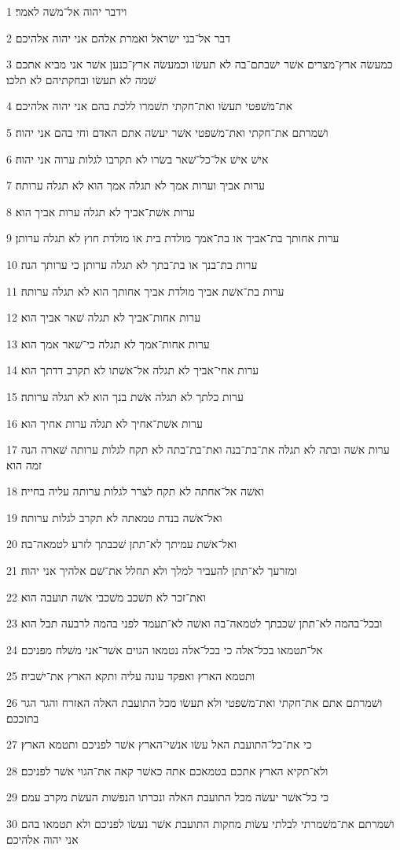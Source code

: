 \par 1 וידבר יהוה אל־משׁה לאמר׃
\par 2 דבר אל־בני ישׂראל ואמרת אלהם אני יהוה אלהיכם׃
\par 3 כמעשׂה ארץ־מצרים אשׁר ישׁבתם־בה לא תעשׂו וכמעשׂה ארץ־כנען אשׁר אני מביא אתכם שׁמה לא תעשׂו ובחקתיהם לא תלכו׃
\par 4 את־משׁפטי תעשׂו ואת־חקתי תשׁמרו ללכת בהם אני יהוה אלהיכם׃
\par 5 ושׁמרתם את־חקתי ואת־משׁפטי אשׁר יעשׂה אתם האדם וחי בהם אני יהוה׃
\par 6 אישׁ אישׁ אל־כל־שׁאר בשׂרו לא תקרבו לגלות ערוה אני יהוה׃
\par 7 ערות אביך וערות אמך לא תגלה אמך הוא לא תגלה ערותה׃
\par 8 ערות אשׁת־אביך לא תגלה ערות אביך הוא׃
\par 9 ערות אחותך בת־אביך או בת־אמך מולדת בית או מולדת חוץ לא תגלה ערותן׃
\par 10 ערות בת־בנך או בת־בתך לא תגלה ערותן כי ערותך הנה׃
\par 11 ערות בת־אשׁת אביך מולדת אביך אחותך הוא לא תגלה ערותה׃
\par 12 ערות אחות־אביך לא תגלה שׁאר אביך הוא׃
\par 13 ערות אחות־אמך לא תגלה כי־שׁאר אמך הוא׃
\par 14 ערות אחי־אביך לא תגלה אל־אשׁתו לא תקרב דדתך הוא׃
\par 15 ערות כלתך לא תגלה אשׁת בנך הוא לא תגלה ערותה׃
\par 16 ערות אשׁת־אחיך לא תגלה ערות אחיך הוא׃
\par 17 ערות אשׁה ובתה לא תגלה את־בת־בנה ואת־בת־בתה לא תקח לגלות ערותה שׁארה הנה זמה הוא׃
\par 18 ואשׁה אל־אחתה לא תקח לצרר לגלות ערותה עליה בחייה׃
\par 19 ואל־אשׁה בנדת טמאתה לא תקרב לגלות ערותה׃
\par 20 ואל־אשׁת עמיתך לא־תתן שׁכבתך לזרע לטמאה־בה׃
\par 21 ומזרעך לא־תתן להעביר למלך ולא תחלל את־שׁם אלהיך אני יהוה׃
\par 22 ואת־זכר לא תשׁכב משׁכבי אשׁה תועבה הוא׃
\par 23 ובכל־בהמה לא־תתן שׁכבתך לטמאה־בה ואשׁה לא־תעמד לפני בהמה לרבעה תבל הוא׃
\par 24 אל־תטמאו בכל־אלה כי בכל־אלה נטמאו הגוים אשׁר־אני משׁלח מפניכם׃
\par 25 ותטמא הארץ ואפקד עונה עליה ותקא הארץ את־ישׁביה׃
\par 26 ושׁמרתם אתם את־חקתי ואת־משׁפטי ולא תעשׂו מכל התועבת האלה האזרח והגר הגר בתוככם׃
\par 27 כי את־כל־התועבת האל עשׂו אנשׁי־הארץ אשׁר לפניכם ותטמא הארץ׃
\par 28 ולא־תקיא הארץ אתכם בטמאכם אתה כאשׁר קאה את־הגוי אשׁר לפניכם׃
\par 29 כי כל־אשׁר יעשׂה מכל התועבת האלה ונכרתו הנפשׁות העשׂת מקרב עמם׃
\par 30 ושׁמרתם את־משׁמרתי לבלתי עשׂות מחקות התועבת אשׁר נעשׂו לפניכם ולא תטמאו בהם אני יהוה אלהיכם׃

